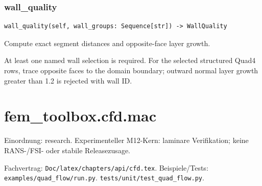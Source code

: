 \subsubsection*{wall\_quality}
\begin{lstlisting}
wall_quality(self, wall_groups: Sequence[str]) -> WallQuality
\end{lstlisting}
Compute exact segment distances and opposite-face layer growth.\par At least one named wall selection is required. For the selected structured Quad4 rows, trace opposite faces to the domain boundary; outward normal layer growth greater than 1.2 is rejected with wall ID.
\section{fem\_toolbox.cfd.mac}
Einordnung: research. Experimenteller M12-Kern: laminare Verifikation; keine RANS-/FSI- oder stabile Releasezusage.
\par Fachvertrag: \nolinkurl{Doc/latex/chapters/api/cfd.tex}. Beispiele/Tests:
\nolinkurl{examples/quad_flow/run.py}.
\nolinkurl{tests/unit/test_quad_flow.py}.
